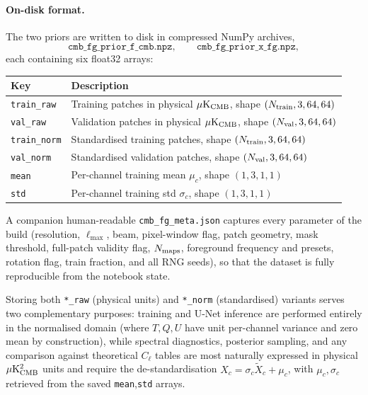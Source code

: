 \documentclass[11pt]{article}
\theoremstyle{definition}
\begin{document}
\paragraph{On-disk format.} The two priors are written to disk in compressed NumPy archives,
\begin{equation}
  \texttt{cmb\_fg\_prior\_f\_cmb.npz},\qquad
  \texttt{cmb\_fg\_prior\_x\_fg.npz},
\end{equation}
each containing six float32 arrays:
\begin{center}
\begin{tabular}{ll}
  \toprule
  Key & Description \\
  \midrule
  \texttt{train\_raw} & Training patches in physical $\mu\mathrm{K}_{\rm CMB}$, shape $(N_{\rm train},3,64,64)$ \\
  \texttt{val\_raw}   & Validation patches in physical $\mu\mathrm{K}_{\rm CMB}$, shape $(N_{\rm val},3,64,64)$ \\
  \texttt{train\_norm} & Standardised training patches, shape $(N_{\rm train},3,64,64)$ \\
  \texttt{val\_norm}   & Standardised validation patches, shape $(N_{\rm val},3,64,64)$ \\
  \texttt{mean}       & Per-channel training mean $\mu_c$, shape $(1,3,1,1)$ \\
  \texttt{std}        & Per-channel training std  $\sigma_c$, shape $(1,3,1,1)$ \\
  \bottomrule
\end{tabular}
\end{center}
A companion human-readable \texttt{cmb\_fg\_meta.json} captures every parameter of the build (resolution, $\ell_{\max}$, beam, pixel-window flag, patch geometry, mask threshold, full-patch validity flag, $N_{\rm maps}$, foreground frequency and presets, rotation flag, train fraction, and all RNG seeds), so that the dataset is fully reproducible from the notebook state.

Storing both \texttt{*\_raw} (physical units) and \texttt{*\_norm} (standardised) variants serves two complementary purposes: training and U-Net inference are performed entirely in the normalised domain (where $T,Q,U$ have unit per-channel variance and zero mean by construction), while spectral diagnostics, posterior sampling, and any comparison against theoretical $C_\ell$ tables are most naturally expressed in physical $\mu\mathrm{K}_{\rm CMB}^2$ units and require the de-standardisation $X_c = \sigma_c\tilde X_c + \mu_c$, with $\mu_c,\sigma_c$ retrieved from the saved \texttt{mean},\texttt{std} arrays.
\end{document}
